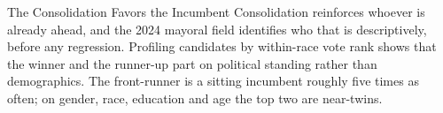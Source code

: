 

\begin{frame}{The Consolidation Favors the Incumbent}
\hypertarget{src:favored}{}
\small
Consolidation reinforces whoever is already ahead, and the 2024 mayoral field identifies who that is descriptively, before any regression. Profiling candidates by within-race vote rank shows that the winner and the runner-up part on political standing rather than demographics. The front-runner is a sitting incumbent roughly five times as often; on gender, race, education and age the top two are near-twins.
\smallskip
\begin{center}
\scriptsize
\resizebox{!}{0.23\textheight}{}
\end{center}
\smallskip
{}
\end{frame}
